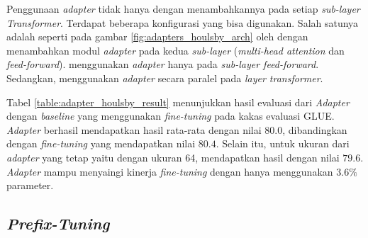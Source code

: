 Penggunaan \textit{adapter} tidak hanya dengan menambahkannya pada setiap \textit{sub-layer Transformer}. Terdapat beberapa konfigurasi yang bisa digunakan. Salah satunya adalah seperti pada gambar \ref{fig:adapters_houlsby_arch} oleh \parencite{adapter_houlsby} dengan menambahkan modul \textit{adapter} pada kedua \textit{sub-layer} (\textit{multi-head attention} dan \textit{feed-forward}). \citeauthor{adapter_pfeiffer} menggunakan \textit{adapter} hanya pada \textit{sub-layer feed-forward}. Sedangkan, \citeauthor{uvpl} menggunakan \textit{adapter} secara paralel pada \textit{layer transformer}.

\begin{table}[h]
    \vspace{0.25cm}
    \centering
    \caption{Hasil evaluasi \textit{Adapter} konfigurasi \citeauthor{adapter_houlsby} pada GLUE \parencite{adapter_houlsby}}
    \label{table:adapter_houlsby_result}
\end{table}

Tabel \ref{table:adapter_houlsby_result} menunjukkan hasil evaluasi dari \textit{Adapter} dengan \textit{baseline} yang menggunakan \textit{fine-tuning} pada kakas evaluasi GLUE. \textit{Adapter} berhasil mendapatkan hasil rata-rata dengan nilai $80.0$, dibandingkan dengan \textit{fine-tuning} yang mendapatkan nilai $80.4$. Selain itu, untuk ukuran dari \textit{adapter} yang tetap yaitu dengan ukuran 64, mendapatkan hasil dengan nilai $79.6$. \textit{Adapter} mampu menyaingi kinerja \textit{fine-tuning} dengan hanya menggunakan $3.6\%$ parameter.

\subsection{\textit{Prefix-Tuning}}

